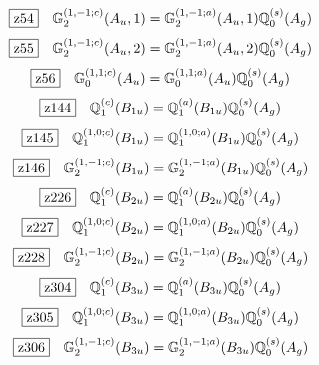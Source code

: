 \documentclass[fleqn,10pt,landscape]{jsarticle}
\begin{document}
\begin{dmath*}
\hspace*{3mm}\fbox{z54}\quad \mathbb{G}_{2}^{(1,-1;c)}(A_{u},1)=\mathbb{G}_{2}^{(1,-1;a)}(A_{u},1) \mathbb{Q}_{0}^{(s)}(A_{g})
\end{dmath*}
\begin{dmath*}
\hspace*{3mm}\fbox{z55}\quad \mathbb{G}_{2}^{(1,-1;c)}(A_{u},2)=\mathbb{G}_{2}^{(1,-1;a)}(A_{u},2) \mathbb{Q}_{0}^{(s)}(A_{g})
\end{dmath*}
\begin{dmath*}
\hspace*{3mm}\fbox{z56}\quad \mathbb{G}_{0}^{(1,1;c)}(A_{u})=\mathbb{G}_{0}^{(1,1;a)}(A_{u}) \mathbb{Q}_{0}^{(s)}(A_{g})
\end{dmath*}
\begin{dmath*}
\hspace*{3mm}\fbox{z144}\quad \mathbb{Q}_{1}^{(c)}(B_{1u})=\mathbb{Q}_{1}^{(a)}(B_{1u}) \mathbb{Q}_{0}^{(s)}(A_{g})
\end{dmath*}
\begin{dmath*}
\hspace*{3mm}\fbox{z145}\quad \mathbb{Q}_{1}^{(1,0;c)}(B_{1u})=\mathbb{Q}_{1}^{(1,0;a)}(B_{1u}) \mathbb{Q}_{0}^{(s)}(A_{g})
\end{dmath*}
\begin{dmath*}
\hspace*{3mm}\fbox{z146}\quad \mathbb{G}_{2}^{(1,-1;c)}(B_{1u})=\mathbb{G}_{2}^{(1,-1;a)}(B_{1u}) \mathbb{Q}_{0}^{(s)}(A_{g})
\end{dmath*}
\begin{dmath*}
\hspace*{3mm}\fbox{z226}\quad \mathbb{Q}_{1}^{(c)}(B_{2u})=\mathbb{Q}_{1}^{(a)}(B_{2u}) \mathbb{Q}_{0}^{(s)}(A_{g})
\end{dmath*}
\begin{dmath*}
\hspace*{3mm}\fbox{z227}\quad \mathbb{Q}_{1}^{(1,0;c)}(B_{2u})=\mathbb{Q}_{1}^{(1,0;a)}(B_{2u}) \mathbb{Q}_{0}^{(s)}(A_{g})
\end{dmath*}
\begin{dmath*}
\hspace*{3mm}\fbox{z228}\quad \mathbb{G}_{2}^{(1,-1;c)}(B_{2u})=\mathbb{G}_{2}^{(1,-1;a)}(B_{2u}) \mathbb{Q}_{0}^{(s)}(A_{g})
\end{dmath*}
\begin{dmath*}
\hspace*{3mm}\fbox{z304}\quad \mathbb{Q}_{1}^{(c)}(B_{3u})=\mathbb{Q}_{1}^{(a)}(B_{3u}) \mathbb{Q}_{0}^{(s)}(A_{g})
\end{dmath*}
\begin{dmath*}
\hspace*{3mm}\fbox{z305}\quad \mathbb{Q}_{1}^{(1,0;c)}(B_{3u})=\mathbb{Q}_{1}^{(1,0;a)}(B_{3u}) \mathbb{Q}_{0}^{(s)}(A_{g})
\end{dmath*}
\begin{dmath*}
\hspace*{3mm}\fbox{z306}\quad \mathbb{G}_{2}^{(1,-1;c)}(B_{3u})=\mathbb{G}_{2}^{(1,-1;a)}(B_{3u}) \mathbb{Q}_{0}^{(s)}(A_{g})
\end{dmath*}
\vspace{5mm}
\end{document}

